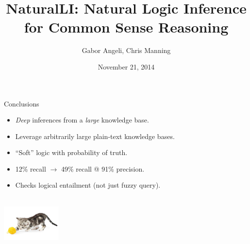 \documentclass[hyperref]{beamer}
\title{NaturalLI: Natural Logic Inference for Common Sense Reasoning}
\subtitle{}
\author{Gabor Angeli, Chris Manning}
\date{November 21, 2014}
\institute[Stanford]{Stanford University}
\begin{document}
\begin{frame}[noframenumbering]
  \titlepage
\end{frame}




%



\begin{frame}{Conclusions}
\begin{itemize}
  \item \textit{Deep} inferences from a \textit{large} knowledge base.
  \item Leverage arbitrarily large plain-text knowledge bases.
  \item ``Soft'' logic with probability of truth.
\end{itemize}
\vspace{0.5cm}
\pause

\begin{itemize}
  \item 12\% recall $\rightarrow$ 49\% recall @ 91\% precision.
  \item Checks logical entailment (not just fuzzy query).
\end{itemize}
\vspace{0.25cm}
\pause

\end{frame}

\begin{frame}[noframenumbering]{}
\begin{center}
   \\
  \vspace{1cm}
  \includegraphics[width=3cm]{../../img/yarn-cat.jpg} \\
\end{center}
\end{frame}
\end{document}

